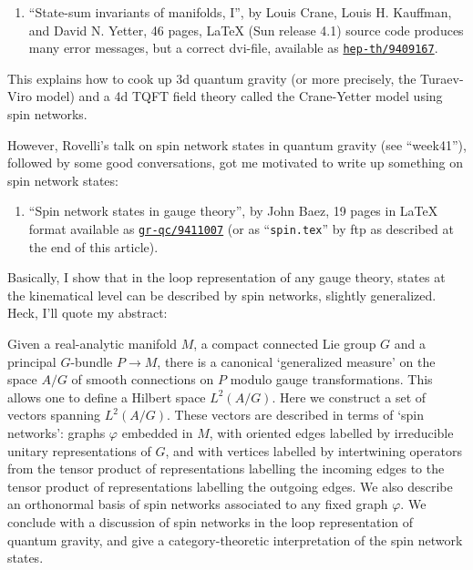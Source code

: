 \documentclass{article}
\def\tightlist{}
\begin{document}
\begin{enumerate}
\def\labelenumi{\arabic{enumi})}
\setcounter{enumi}{3}
\tightlist
\item
  ``State-sum invariants of manifolds, I'', by Louis Crane, Louis H.
  Kauffman, and David N. Yetter, 46 pages, LaTeX (Sun release 4.1)
  source code produces many error messages, but a correct dvi-file,
  available as
  \href{http://xxx.lanl.gov/abs/hep-th/9409167}{\texttt{hep-th/9409167}}.
\end{enumerate}

This explains how to cook up 3d quantum gravity (or more precisely, the
Turaev-Viro model) and a 4d TQFT field theory called the Crane-Yetter
model using spin networks.

However, Rovelli's talk on spin network states in quantum gravity (see
``week41''), followed by some good conversations, got me motivated to
write up something on spin network states:

\begin{enumerate}
\def\labelenumi{\arabic{enumi})}
\setcounter{enumi}{4}
\tightlist
\item
  ``Spin network states in gauge theory'', by John Baez, 19 pages in
  LaTeX format available as
  \href{http://xxx.lanl.gov/abs/gr-qc/9411007}{\texttt{gr-qc/9411007}}
  (or as ``\texttt{spin.tex}'' by ftp as described at the end of this
  article).
\end{enumerate}

Basically, I show that in the loop representation of any gauge theory,
states at the kinematical level can be described by spin networks,
slightly generalized. Heck, I'll quote my abstract:

Given a real-analytic manifold \(M\), a compact connected Lie group
\(G\) and a principal \(G\)-bundle \(P \to M\), there is a canonical
`generalized measure' on the space \(A/G\) of smooth connections on
\(P\) modulo gauge transformations. This allows one to define a Hilbert
space \(L^2(A/G)\). Here we construct a set of vectors spanning
\(L^2(A/G)\). These vectors are described in terms of `spin networks':
graphs \(\varphi\) embedded in \(M\), with oriented edges labelled by
irreducible unitary representations of \(G\), and with vertices labelled
by intertwining operators from the tensor product of representations
labelling the incoming edges to the tensor product of representations
labelling the outgoing edges. We also describe an orthonormal basis of
spin networks associated to any fixed graph \(\varphi\). We conclude
with a discussion of spin networks in the loop representation of quantum
gravity, and give a category-theoretic interpretation of the spin
network states.
\end{document}
